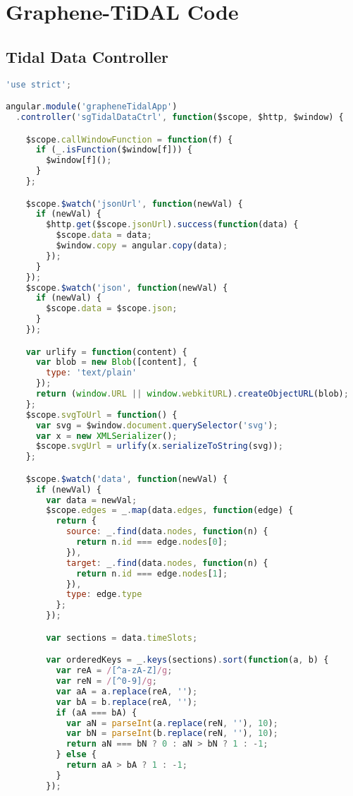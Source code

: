 \chapter{Graphene-TiDAL Code}
\label{appendix-tidal}
\section{Tidal Data Controller}
\label{appendix-tidal-dataCtrl}

\begin{lstlisting}[language=JavaScript]
'use strict';

angular.module('grapheneTidalApp')
  .controller('sgTidalDataCtrl', function($scope, $http, $window) {

    $scope.callWindowFunction = function(f) {
      if (_.isFunction($window[f])) {
        $window[f]();
      }
    };

    $scope.$watch('jsonUrl', function(newVal) {
      if (newVal) {
        $http.get($scope.jsonUrl).success(function(data) {
          $scope.data = data;
          $window.copy = angular.copy(data);
        });
      }
    });
    $scope.$watch('json', function(newVal) {
      if (newVal) {
        $scope.data = $scope.json;
      }
    });

    var urlify = function(content) {
      var blob = new Blob([content], {
        type: 'text/plain'
      });
      return (window.URL || window.webkitURL).createObjectURL(blob);
    };
    $scope.svgToUrl = function() {
      var svg = $window.document.querySelector('svg');
      var x = new XMLSerializer();
      $scope.svgUrl = urlify(x.serializeToString(svg));
    };

    $scope.$watch('data', function(newVal) {
      if (newVal) {
        var data = newVal;
        $scope.edges = _.map(data.edges, function(edge) {
          return {
            source: _.find(data.nodes, function(n) {
              return n.id === edge.nodes[0];
            }),
            target: _.find(data.nodes, function(n) {
              return n.id === edge.nodes[1];
            }),
            type: edge.type
          };
        });

        var sections = data.timeSlots;

        var orderedKeys = _.keys(sections).sort(function(a, b) {
          var reA = /[^a-zA-Z]/g;
          var reN = /[^0-9]/g;
          var aA = a.replace(reA, '');
          var bA = b.replace(reA, '');
          if (aA === bA) {
            var aN = parseInt(a.replace(reN, ''), 10);
            var bN = parseInt(b.replace(reN, ''), 10);
            return aN === bN ? 0 : aN > bN ? 1 : -1;
          } else {
            return aA > bA ? 1 : -1;
          }
        });


\end{lstlisting}
